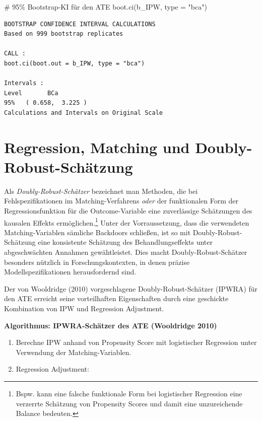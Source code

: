\documentclass[
  a4paper,
  DIV=11,
  oneside]{scrreprt}
\newenvironment{Shaded}{\begin{snugshade}}{\end{snugshade}}
\newcommand{\AttributeTok}[1]{\textcolor[rgb]{0.40,0.45,0.13}{#1}}
\newcommand{\CommentTok}[1]{\textcolor[rgb]{0.37,0.37,0.37}{#1}}
\newcommand{\FunctionTok}[1]{\textcolor[rgb]{0.28,0.35,0.67}{#1}}
\newcommand{\NormalTok}[1]{\textcolor[rgb]{0.00,0.23,0.31}{#1}}
\newcommand{\StringTok}[1]{\textcolor[rgb]{0.13,0.47,0.30}{#1}}
\begin{document}
\begin{Shaded}
\begin{Highlighting}[]
\CommentTok{\# 95\% Bootstrap{-}KI für den ATE}
\FunctionTok{boot.ci}\NormalTok{(b\_IPW, }\AttributeTok{type =} \StringTok{"bca"}\NormalTok{)}
\end{Highlighting}
\end{Shaded}

\begin{verbatim}
BOOTSTRAP CONFIDENCE INTERVAL CALCULATIONS
Based on 999 bootstrap replicates

CALL : 
boot.ci(boot.out = b_IPW, type = "bca")

Intervals : 
Level       BCa          
95%   ( 0.658,  3.225 )  
Calculations and Intervals on Original Scale
\end{verbatim}

\hypertarget{regression-matching-und-doubly-robust-schuxe4tzung}{%
\section{Regression, Matching und
Doubly-Robust-Schätzung}\label{regression-matching-und-doubly-robust-schuxe4tzung}}

Als \emph{Doubly-Robust-Schätzer} bezeichnet man Methoden, die bei
Fehlspezifikationen im Matching-Verfahrens \emph{oder} der funktionalen
Form der Regressionsfunktion für die Outcome-Variable eine zuverlässige
Schätzungen des kausalen Effekts ermöglichen.\footnote{Bspw. kann eine
  falsche funktionale Form bei logistischer Regression eine verzerrte
  Schätzung von Propensity Scores und damit eine unzureichende Balance
  bedeuten.} Unter der Vorraussetzung, dass die verwendeten
Matching-Variablen sämliche Backdoors schließen, ist so mit
Doubly-Robust-Schätzung eine konsistente Schätzung des
Behandlungseffekts unter abgeschwächten Annahmen gewähtleistet. Dies
macht Doubly-Robust-Schätzer besonders nützlich in Forschungskontexten,
in denen präzise Modellspezifikationen herausfordernd sind.

Der von Wooldridge (2010) vorgeschlagene Doubly-Robust-Schätzer (IPWRA)
für den ATE erreicht seine vorteilhaften Eigenschaften durch eine
geschickte Kombination von IPW und Regression Adjustment.

\textbf{Algorithmus: IPWRA-Schätzer des ATE (Wooldridge 2010)}

\begin{enumerate}
\def\labelenumi{\arabic{enumi}.}
\item
  Berechne IPW anhand von Propensity Score mit logistischer Regression
  unter Verwendung der Matching-Variablen.
\item
  Regression Adjustment:
\end{enumerate}
\end{document}
